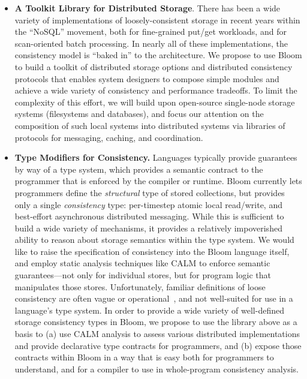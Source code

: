 \begin{itemize}
\item \textbf{A Toolkit Library for Distributed Storage}.  There has been a wide variety of implementations of loosely-consistent storage in recent years within the ``NoSQL'' movement, both for fine-grained put/get workloads, and for scan-oriented batch processing.  In nearly all of these implementations, the consistency model is ``baked in'' to the architecture.  We propose to use Bloom to build a toolkit of distributed storage options and distributed consistency protocols that enables system designers to compose simple modules and achieve a wide variety of consistency and performance tradeoffs.  To limit the complexity of this effort, we will build upon open-source single-node storage systems (filesystems and databases), and focus our attention on the composition of such local systems into distributed systems via libraries of protocols for messaging, caching, and coordination.

\item \textbf{Type Modifiers for Consistency.}  Languages typically provide guarantees by way of a type system, which provides a semantic contract to the programmer that is enforced by the compiler or runtime. Bloom currently lets programmers define the \emph{structural} type of stored collections, but provides only a single \emph{consistency} type: per-timestep atomic local read/write, and best-effort asynchronous distributed messaging.  While this is sufficient to build a wide variety of mechanisms, it provides a relatively impoverished ability to reason about storage semantics within the type system.
We would like to raise the specification of consistency into the Bloom language itself, and employ static analysis techniques like CALM to enforce semantic guarantees---not only for individual stores, but for program logic that manipulates those stores.  Unfortunately, familiar definitions of loose consistency are often vague or operational~\cite{Vogels,Terry}, and not well-suited for use in a language's type system.  In order to provide a wide variety of well-defined storage consistency types in Bloom, we propose to use the library above as a basis to (a) use CALM analysis to assess various distributed implementations and provide declarative type contracts for programmers, and (b) expose those contracts within Bloom in a way that is easy both for programmers to understand, and for a compiler to use in whole-program consistency analysis.


\end{itemize}
